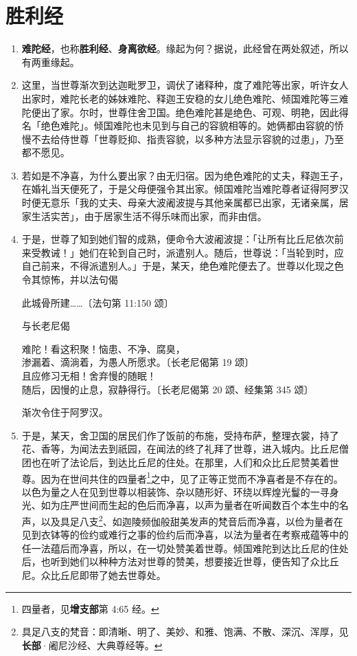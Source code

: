 \section{胜利经}

\begin{enumerate}\item \textbf{难陀经}，也称\textbf{胜利经}、\textbf{身离欲经}。缘起为何？据说，此经曾在两处叙述，所以有两重缘起。
\item 这里，当世尊渐次到达迦毗罗卫，调伏了诸释种，度了难陀等出家，听许女人出家时，难陀长老的姊妹难陀、释迦王安稳的女儿绝色难陀、倾国难陀等三难陀便出了家。尔时，世尊住舍卫国。绝色难陀甚是绝色、可观、明艳，因此得名「绝色难陀」。倾国难陀也未见到与自己的容貌相等的。她俩都由容貌的㤭慢不去给侍世尊「世尊贬抑、指责容貌，以多种方法显示容貌的过患」，乃至都不愿见。
\item 若如是不净喜，为什么要出家？由无归宿。因为绝色难陀的丈夫，释迦王子，在婚礼当天便死了，于是父母便强令其出家。倾国难陀当难陀尊者证得阿罗汉时便无意乐「我的丈夫、母亲大波阇波提与其他亲属都已出家，无诸亲属，居家生活实苦」，由于居家生活不得乐味而出家，而非由信。
\item 于是，世尊了知到她们智的成熟，便命令大波阇波提：「让所有比丘尼依次前来受教诫！」她们在轮到自己时，派遣别人。随后，世尊说：「当轮到时，应自己前来，不得派遣别人。」于是，某天，绝色难陀便去了。世尊以化现之色令其惊怖，并以法句偈\begin{quoting}此城骨所建……{\bluefootnotesize 〔法句第 11:150 颂〕}\end{quoting}与长老尼偈\begin{quoting}难陀！看这积聚！恼患、不净、腐臭，\\渗漏着、滴淌着，为愚人所愿求。{\bluefootnotesize 〔长老尼偈第 19 颂〕}\\且应修习无相！舍弃慢的随眠！\\随后，因慢的止息，寂静得行。{\bluefootnotesize 〔长老尼偈第 20 颂、经集第 345 颂〕}\end{quoting}渐次令住于阿罗汉。
\item 于是，某天，舍卫国的居民们作了饭前的布施，受持布萨，整理衣裳，持了花、香等，为闻法去到祇园，在闻法的终了礼拜了世尊，进入城内。比丘尼僧团也在听了法论后，到达比丘尼的住处。在那里，人们和众比丘尼赞美着世尊。因为在世间共住的四量者\footnote{四量者，见\textbf{增支部}第 4:65 经。}之中，见了正等正觉而不净喜者是不存在的。以色为量之人在见到世尊以相装饰、杂以随形好、环绕以辉煌光鬘的一寻身光、如为庄严世间而生起的色后而净喜，以声为量者在听闻数百个本生中的名声，以及具足八支\footnote{具足八支的梵音：即清晰、明了、美妙、和雅、饱满、不散、深沉、浑厚，见\textbf{长部}·阇尼沙经、大典尊经等。}、如迦陵频伽般甜美发声的梵音后而净喜，以俭为量者在见到衣钵等的俭约或难行之事的俭约后而净喜，以法为量者在考察戒蕴等中的任一法蕴后而净喜，所以，在一切处赞美着世尊。倾国难陀到达比丘尼的住处后，也听到她们以种种方法对世尊的赞美，想要接近世尊，便告知了众比丘尼。众比丘尼即带了她去世尊处。

\end{enumerate}
